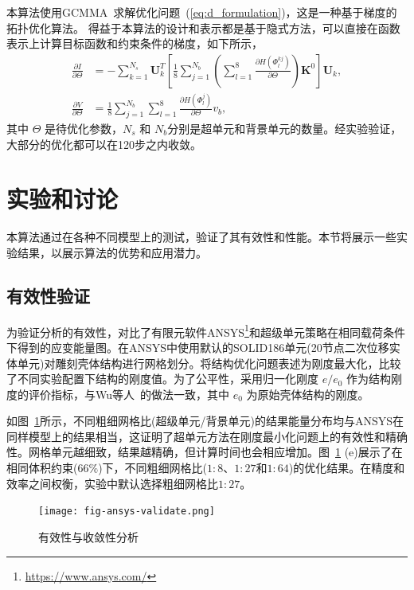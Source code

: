 本算法使用GCMMA~\cite{Svanberg2002,Wu2005}求解优化问题~(\ref{eq:d_formulation})，这是一种基于梯度的拓扑优化算法。
得益于本算法的设计和表示都是基于隐式方法，可以直接在函数表示上计算目标函数和约束条件的梯度，如下所示，
\begin{align}
    \frac{\partial I}{\partial \Theta}
    &=-\sum_{k=1}^{N_s}\textbf{U}_k^T\left[\frac{1}{8}\sum_{j=1}^{N_b}\left(\sum_{l=1}^8 \frac{\partial H(\Phi_l^{kj})}{\partial \Theta}\right)\textbf{K}^0\right]\textbf{U}_k,\\
    \frac{\partial V}{\partial \Theta}&=\frac{1}{8}\sum_{j=1}^{N_b}\sum_{l=1}^8\frac{\partial H(\Phi^{j}_{l})}{\partial \Theta}v_b, 
\end{align}
其中 $\Theta$ 是待优化参数，$N_s$ 和 $N_b$分别是超单元和背景单元的数量。经实验验证，大部分的优化都可以在120步之内收敛。

\section{实验和讨论}\label{sec:experiment}
本算法通过在各种不同模型上的测试，验证了其有效性和性能。本节将展示一些实验结果，以展示算法的优势和应用潜力。

\subsection{有效性验证}
为验证分析的有效性，对比了有限元软件ANSYS\footnote{\url{https://www.ansys.com/}}和超级单元策略在相同载荷条件下得到的应变能量图。在ANSYS中使用默认的SOLID186单元(20节点二次位移实体单元)对雕刻壳体结构进行网格划分。将结构优化问题表述为刚度最大化，比较了不同实验配置下结构的刚度值。为了公平性，采用归一化刚度 $e/e_0$ 作为结构刚度的评价指标，与Wu等人~\cite{Wu2018TVCG}的做法一致，其中 $e_0$ 为原始壳体结构的刚度。

如图~\ref{fig-validity}所示，不同粗细网格比(超级单元/背景单元)的结果能量分布均与ANSYS在同样模型上的结果相当，这证明了超单元方法在刚度最小化问题上的有效性和精确性。网格单元越细致，结果越精确，但计算时间也会相应增加。图~\ref{fig-validity} (e)展示了在相同体积约束($66\%$)下，不同粗细网格比($1:8$、$1:27$和$1:64$)的优化结果。在精度和效率之间权衡，实验中默认选择粗细网格比$1:27$。
\begin{figure}[htbp]
    \centering
    \texttt{[image: fig-ansys-validate.png]}
    \caption{有效性与收敛性分析}
    \label{fig-validity}
\end{figure}

